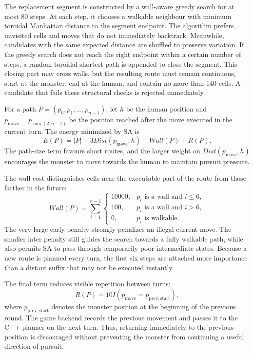 \documentclass[12pt,a4paper]{article}
\begin{document}
The replacement segment is constructed by a wall-aware greedy search for at
most 80 steps. At each step, it chooses a walkable neighbour with minimum
toroidal Manhattan distance to the segment endpoint. The algorithm prefers unvisited cells and moves
that do not immediately backtrack. Meanwhile, candidates with the same expected distance
are shuffled to preserve variation. If the greedy search does not reach the right
endpoint within a certain number of steps, a random toroidal shortest path is appended to
close the segment. This closing part may cross walls, but the resulting route
must remain continuous, start at the monster, end at the human, and contain no
more than 140 cells. A candidate that fails these structural checks is rejected
immediately.

For a path $P=(p_0,p_1,\ldots,p_{n-1})$, let $h$ be the human position and
$p_{\mathrm{move}}=p_{\min(2,n-1)}$ be the position reached after the move
executed in the current turn. The energy minimized by SA is
\[
E(P)=|P|+3Dist(p_{\mathrm{move}},h)+Wall(P)+R(P).
\]
The path-size term favours short routes, and the larger weight on
$Dist(p_{\mathrm{move}},h)$ encourages the monster to move towards the human
to maintain pursuit pressure.

The wall cost distinguishes cells near the executable part of the route from
those farther in the future:
\[
Wall(P)=\sum_{i=1}^{n-1}
\begin{cases}
10000, & p_i\text{ is a wall and }i\leq 6,\\
100,   & p_i\text{ is a wall and }i>6,\\
0,     & p_i\text{ is walkable.}
\end{cases}
\]
The very large early penalty strongly penalizes an illegal current move. The
smaller later penalty still guides the search towards a fully walkable path,
while also permits SA to pass through temporarily poor intermediate states. Because a
new route is planned every turn, the first six steps are attached more importance than a
distant suffix that may not be executed instantly.

The final term reduces visible repetition between turns:
\[
R(P)=10I(p_{\mathrm{move}}=p_{\mathrm{prev,start}}),
\]
where $p_{\mathrm{prev,start}}$ denotes the monster position at the beginning of
the previous round. The game backend records the previous movement and passes
it to the C++ planner on the next turn. Thus, returning immediately to the
previous position is discouraged without preventing the monster from
continuing a useful direction of pursuit.
\end{document}
